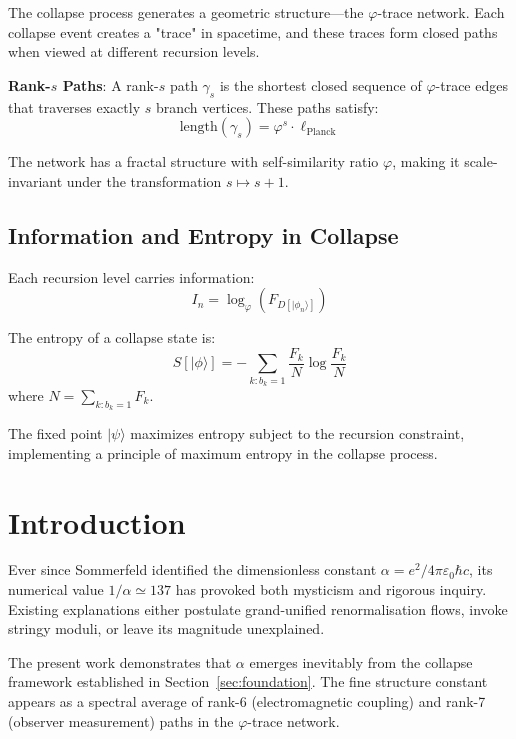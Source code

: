 \documentclass[%
 reprint,
 amsmath,amssymb,
 aps,
 prd,
 10pt,
 nofootinbib,      %
 longbibliography  %
]{revtex4-2}
\theoremstyle{definition}
\theoremstyle{remark}
\begin{document}
The collapse process generates a geometric structure—the $\varphi$-trace network. Each collapse event creates a "trace" in spacetime, and these traces form closed paths when viewed at different recursion levels.

\textbf{Rank-$s$ Paths}: A rank-$s$ path $\gamma_s$ is the shortest closed sequence of $\varphi$-trace edges that traverses exactly $s$ branch vertices. These paths satisfy:
\begin{equation}
\text{length}(\gamma_s) = \varphi^s \cdot \ell_{\text{Planck}}
\end{equation}

The network has a fractal structure with self-similarity ratio $\varphi$, making it scale-invariant under the transformation $s \mapsto s+1$.

\subsection{Information and Entropy in Collapse}

Each recursion level carries information:
\begin{equation}
I_n = \log_\varphi(F_{D[|\phi_n\rangle]})
\end{equation}

The entropy of a collapse state is:
\begin{equation}
S[|\phi\rangle] = -\sum_{k: b_k=1} \frac{F_k}{N} \log \frac{F_k}{N}
\end{equation}
where $N = \sum_{k: b_k=1} F_k$.

The fixed point $|\psi\rangle$ maximizes entropy subject to the recursion constraint, implementing a principle of maximum entropy in the collapse process.

\section{Introduction}\label{sec:intro}

Ever since Sommerfeld identified the dimensionless constant
\(\alpha = e^2/4\pi\varepsilon_0\hbar c\),
its numerical value
\(1/\alpha \simeq 137\)
has provoked both mysticism and rigorous inquiry.
Existing explanations either
postulate grand-unified renormalisation flows,
invoke stringy moduli,
or leave its magnitude unexplained.

The present work demonstrates that $\alpha$ emerges inevitably from the collapse framework established in Section~\ref{sec:foundation}. 
The fine structure constant appears as a spectral average of rank-6 (electromagnetic coupling) and rank-7 (observer measurement) paths in the $\varphi$-trace network.
\end{document}
